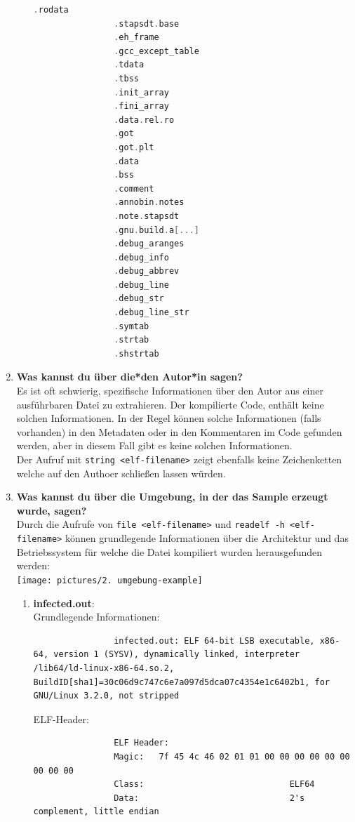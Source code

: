 \documentclass{article}
\begin{document}
\begin{enumerate}
\begin{enumerate}
\begin{lstlisting}[language=c]
				.rodata
				.stapsdt.base
				.eh_frame
				.gcc_except_table
				.tdata
				.tbss
				.init_array
				.fini_array
				.data.rel.ro
				.got
				.got.plt
				.data
				.bss
				.comment
				.annobin.notes
				.note.stapsdt
				.gnu.build.a[...]
				.debug_aranges
				.debug_info
				.debug_abbrev
				.debug_line
				.debug_str
				.debug_line_str
				.symtab
				.strtab
				.shstrtab
			\end{lstlisting}
		\end{enumerate}
		\item \textbf{Was kannst du über die*den Autor*in sagen?}\\
		Es ist oft schwierig, spezifische Informationen über den Autor aus einer ausführbaren Datei zu extrahieren. Der kompilierte Code, enthält keine solchen Informationen. In der Regel können solche Informationen (falls vorhanden) in den Metadaten oder in den Kommentaren im Code gefunden werden, aber in diesem Fall gibt es keine solchen Informationen.\\
		Der Aufruf mit \texttt{string <elf-filename>} zeigt ebenfalls keine Zeichenketten welche auf den Authoer schließen lassen würden.\\
		\item \textbf{Was kannst du über die Umgebung, in der das Sample erzeugt wurde, sagen?}\\
		Durch die Aufrufe von \texttt{file <elf-filename>} und \texttt{readelf -h <elf-filename>} können grundlegende Informationen über die Architektur und das Betriebssystem für welche die Datei kompiliert wurden herausgefunden werden:\\
		\texttt{[image: pictures/2. umgebung-example]}\\
				\begin{enumerate}
			\item \textbf{infected.out}:\\
			Grundlegende Informationen:\\
			\begin{lstlisting}
				infected.out: ELF 64-bit LSB executable, x86-64, version 1 (SYSV), dynamically linked, interpreter /lib64/ld-linux-x86-64.so.2, BuildID[sha1]=30c06d9c747c6e7a097d5dca07c4354e1c6402b1, for GNU/Linux 3.2.0, not stripped
			\end{lstlisting}
			ELF-Header:\\
			\begin{lstlisting}
				ELF Header:
				Magic:   7f 45 4c 46 02 01 01 00 00 00 00 00 00 00 00 00
				Class:                             ELF64
				Data:                              2's complement, little endian

\end{lstlisting}
\end{enumerate}
\end{enumerate}
\end{document}
